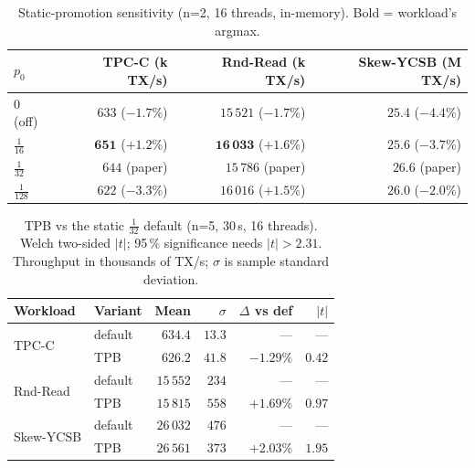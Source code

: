 \documentclass[10pt]{article}
\begin{document}
\begin{table}[h]
\centering\small
\caption{Static-promotion sensitivity (n=2, 16 threads, in-memory).
  Bold = workload's argmax.}
\label{tab:sweep}
\begin{tabular}{lrrr}
\toprule
$p_0$ & TPC-C (k TX/s) & Rnd-Read (k TX/s) & Skew-YCSB (M TX/s) \\
\midrule
$0$ (off)        & $633$ ($-1.7\%$)          & $15\,521$ ($-1.7\%$)          & $25.4$ ($-4.4\%$) \\
$\tfrac{1}{16}$  & $\mathbf{651}$ ($+1.2\%$) & $\mathbf{16\,033}$ ($+1.6\%$) & $25.6$ ($-3.7\%$) \\
$\tfrac{1}{32}$  & $644$ (paper)             & $15\,786$ (paper)             & $\mathbf{26.6}$ (paper) \\
$\tfrac{1}{128}$ & $622$ ($-3.3\%$)          & $16\,016$ ($+1.5\%$)          & $26.0$ ($-2.0\%$) \\
\bottomrule
\end{tabular}
\end{table}

\begin{table}[h]
\centering\small
\caption{TPB vs the static $\tfrac{1}{32}$ default (n=5, 30\,s, 16 threads).
  Welch two-sided $|t|$; 95\,\% significance needs $|t|>2.31$.
  Throughput in thousands of TX/s; $\sigma$ is sample standard deviation.}
\label{tab:tpb}
\begin{tabular}{llrrrr}
\toprule
Workload & Variant & Mean & $\sigma$ & $\Delta$ vs def & $|t|$ \\
\midrule
\multirow{2}{*}{TPC-C}     & default & $634.4$   & $13.3$ & ---        & ---  \\
                           & TPB     & $626.2$   & $41.8$ & $-1.29\%$  & $0.42$ \\
\midrule
\multirow{2}{*}{Rnd-Read}  & default & $15\,552$ & $234$  & ---        & ---  \\
                           & TPB     & $15\,815$ & $558$  & $+1.69\%$  & $0.97$ \\
\midrule
\multirow{2}{*}{Skew-YCSB} & default & $26\,032$ & $476$  & ---        & ---  \\
                           & TPB     & $26\,561$ & $373$  & $+2.03\%$  & $1.95$ \\
\bottomrule
\end{tabular}
\end{table}
\end{document}
